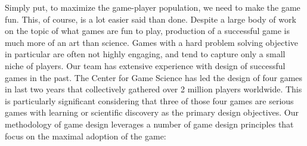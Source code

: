 \documentclass{sig-alternate}
\begin{document}
Simply put, to maximize the game-player population, we need to make
the game fun. This, of course, is a lot easier said than done. Despite
a large body of work on the topic of what games are fun to play,
production of a successful game is much more of an art than science.
Games with a hard problem solving objective in particular are often
not highly engaging, and tend to capture only a small niche of
players.  Our team has extensive experience with design of successful
games in the past.  The Center for Game Science has led the design of
four games in last two years that collectively gathered over 2 million
players worldwide.  This is particularly significant considering that
three of those four games are serious games with learning or
scientific discovery as the primary design objectives.  Our
methodology of game design leverages a number of game design
principles that focus on the maximal adoption of the game:
%
\end{document}
